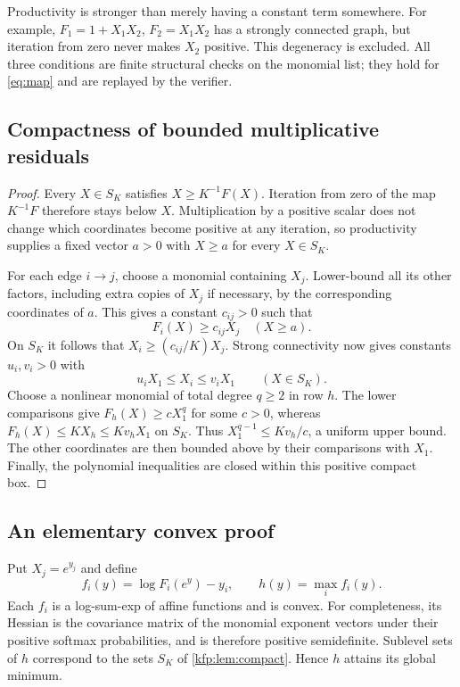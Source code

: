 \documentclass[11pt,a4paper]{article}
\newtheorem{lemma}[theorem]{Lemma}
\theoremstyle{definition}
\theoremstyle{remark}
\newcommand{\R}{\mathbb R}
\begin{document}
Productivity is stronger than merely having a constant term somewhere.
For example, $F_1=1+X_1X_2$, $F_2=X_1X_2$ has a strongly connected graph,
but iteration from zero never makes $X_2$ positive. This degeneracy is
excluded. All three conditions are finite structural checks on the monomial
list; they hold for \eqref{eq:map} and are replayed by the verifier.

\subsection{Compactness of bounded multiplicative residuals}
\begin{proof}
Every $X\in S_K$ satisfies $X\geq K^{-1}F(X)$. Iteration from zero of the
map $K^{-1}F$ therefore stays below $X$. Multiplication by a positive scalar
does not change which coordinates become positive at any iteration, so
productivity supplies a fixed vector $a>0$ with $X\geq a$ for every
$X\in S_K$.

For each edge $i\to j$, choose a monomial containing $X_j$. Lower-bound all
its other factors, including extra copies of $X_j$ if necessary, by the
corresponding coordinates of $a$. This gives a constant $c_{ij}>0$ such that
\[
 F_i(X)\geq c_{ij}X_j\quad(X\geq a).
\]
On $S_K$ it follows that $X_i\geq(c_{ij}/K)X_j$.
Strong connectivity now gives constants $u_i,v_i>0$ with
\[
 u_iX_1\leq X_i\leq v_iX_1
 \qquad(X\in S_K).
\]
Choose a nonlinear monomial of total degree $q\geq2$ in row $h$.
The lower comparisons give $F_h(X)\geq cX_1^q$ for some $c>0$,
whereas $F_h(X)\leq KX_h\leq Kv_hX_1$ on $S_K$.
Thus $X_1^{q-1}\leq Kv_h/c$, a uniform upper bound.
The other coordinates are then bounded above by their comparisons with
$X_1$. Finally, the polynomial inequalities are closed within this positive
compact box.
\end{proof}

\subsection{An elementary convex proof}
Put $X_j=e^{y_j}$ and define
\begin{equation}\label{kfp:eq:h}
 f_i(y)=\log F_i(e^y)-y_i,
 \qquad h(y)=\max_i f_i(y).
\end{equation}
Each $f_i$ is a log-sum-exp of affine functions and is convex. For
completeness, its Hessian is the covariance matrix of the monomial exponent
vectors under their positive softmax probabilities, and is therefore
positive semidefinite. Sublevel sets of $h$ correspond to the sets $S_K$ of
\cref{kfp:lem:compact}. Hence $h$ attains its global minimum.
\end{document}
